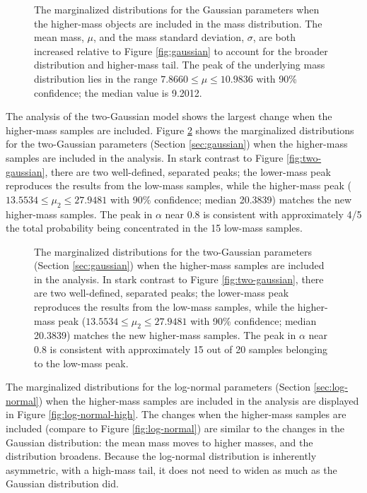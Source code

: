 \documentclass[preprint]{aastex}
\begin{document}
\begin{figure}
  \begin{center}
  \end{center}
  \caption{\label{fig:gaussian-high} The marginalized distributions
    for the Gaussian parameters when the higher-mass objects are
    included in the mass distribution.  The mean mass, $\mu$, and the
    mass standard deviation, $\sigma$, are both increased relative to
    Figure \ref{fig:gaussian} to account for the broader distribution
    and higher-mass tail.  The peak of the underlying mass
    distribution lies in the range $7.8660 \leq \mu \leq 10.9836$ with
    90\% confidence; the median value is 9.2012.}
\end{figure}

The analysis of the two-Gaussian model shows the largest change when
the higher-mass samples are included.  Figure
\ref{fig:two-gaussian-high} shows the marginalized distributions for
the two-Gaussian parameters (Section \ref{sec:gaussian}) when the
higher-mass samples are included in the analysis.  In stark contrast
to Figure \ref{fig:two-gaussian}, there are two well-defined,
separated peaks; the lower-mass peak reproduces the results from the
low-mass samples, while the higher-mass peak ($13.5534 \leq \mu_2 \leq
27.9481$ with 90\% confidence; median 20.3839) matches the new
higher-mass samples.  The peak in $\alpha$ near 0.8 is consistent with
approximately 4/5 the total probability being concentrated in the 15
low-mass samples.

\begin{figure}
  \begin{center}
  \end{center}
  \caption{\label{fig:two-gaussian-high} The marginalized
    distributions for the two-Gaussian parameters (Section
    \ref{sec:gaussian}) when the higher-mass samples are included in
    the analysis.  In stark contrast to Figure \ref{fig:two-gaussian},
    there are two well-defined, separated peaks; the lower-mass peak
    reproduces the results from the low-mass samples, while the
    higher-mass peak ($13.5534 \leq \mu_2 \leq 27.9481$ with 90\%
    confidence; median 20.3839) matches the new higher-mass samples.
    The peak in $\alpha$ near 0.8 is consistent with approximately 15
    out of 20 samples belonging to the low-mass peak.}
\end{figure}

The marginalized distributions for the log-normal parameters (Section
\ref{sec:log-normal}) when the higher-mass samples are included in the
analysis are displayed in Figure \ref{fig:log-normal-high}.  The
changes when the higher-mass samples are included (compare to Figure
\ref{fig:log-normal}) are similar to the changes in the Gaussian
distribution: the mean mass moves to higher masses, and the
distribution broadens.  Because the log-normal distribution is
inherently asymmetric, with a high-mass tail, it does not need to
widen as much as the Gaussian distribution did.
\end{document}
